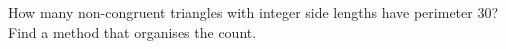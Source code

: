 How many non-congruent triangles with integer side lengths have perimeter $30$? Find a method that organises the count.
